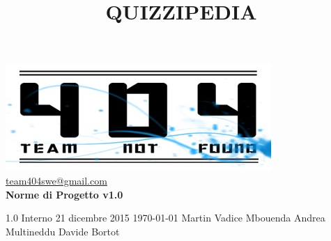 \documentclass[a4paper,11pt]{article}
\title{\textbf{{\fontsize{8mm}{5mm}\selectfont QUIZZIPEDIA}}}
\date{}
\author{}
\begin{document}
	\maketitle
	\thispagestyle{empty}
	\begin{center}
	\includegraphics{../team_not_found.jpg}\\
	\fontsize{5mm}{3mm}\url{team404swe@gmail.com}\\
	
	\vspace{50mm}
	\textbf{Norme di Progetto v1.0}
	\end{center}
	
			{1.0} 							%
			{Interno} 						%
			{21 dicembre 2015} 				%
			{\today} 						%
			{Martin Vadice Mbouenda}		%
			{Andrea Multineddu} 			%
			{Davide Bortot} 				%
	\newpage
	\null
	\thispagestyle{empty}
	
	\newpage	
	\newpage
	\fancyfoot[R]{\thepage}
	
	\hspace{30 mm}
\end{document}
